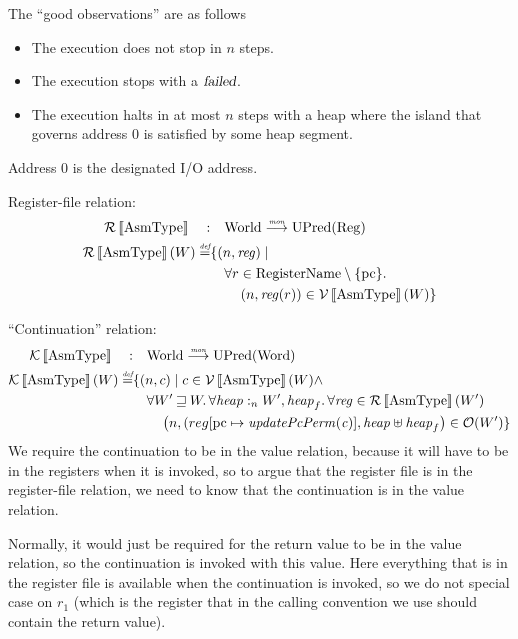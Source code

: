 \documentclass{article}
\newcommand{\update}[2]{[#1 \mapsto #2]}
\newcommand{\sem}[1]{\left\llbracket #1 \right\rrbracket}
\newcommand{\monfun}{\stackrel{\textit{\tiny{mon}}}{\longrightarrow}}
\newcommand{\defeq}{\stackrel{\textit{\tiny{def}}}{=}}
\newcommand{\var}[1]{\mathit{#1}}
\newcommand{\pcreg}{\mathrm{pc}}
\newcommand{\reg}{\var{reg}}
\newcommand{\heap}{\var{heap}}
\newcommand{\failed}{\textsl{failed}}
\newcommand{\plainfun}[1]{\mathit{#1}}
\newcommand{\updatePcPerm}[1]{\plainfun{updatePcPerm}(#1)}
\newcommand{\future}{\mathbin{\sqsupseteq}}
\newcommand{\heapSat}[3][\heap]{#1 :_{#2} #3}
\newcommand{\asmType}{\plaindom{AsmType}}
\newcommand{\plaindom}[1]{\mathrm{#1}}
\newcommand{\Words}{\plaindom{Word}}
\newcommand{\RegName}{\plaindom{RegisterName}}
\newcommand{\Regs}{\plaindom{Reg}}
\newcommand{\Worlds}{\plaindom{World}}
\newcommand{\UPred}[1]{\plaindom{UPred}(#1)}
\newcommand{\intr}[2]{\mathcal{#1}\sem{#2}}
\newcommand{\valueintr}[1]{\intr{V}{#1}}
\newcommand{\contintr}[1]{\intr{K}{#1}}
\newcommand{\regintr}[1]{\intr{R}{#1}}
\newcommand{\stdvr}{\valueintr{\asmType}}
\newcommand{\stdrr}{\regintr{\asmType}}
\newcommand{\stdkr}{\contintr{\asmType}}
\newcommand{\observations}{\mathcal{O}}
\newcommand{\npair}[2][n]{\left(#1,#2 \right)}
\begin{document}
The ``good observations'' are as follows
\begin{itemize}
\item The execution does not stop in $n$ steps. 
\item The execution stops with a $\failed$.
\item The execution halts in at most $n$ steps with a heap where the island that governs address 0 is satisfied by some heap segment.
\end{itemize}
Address 0 is the designated I/O address.

Register-file relation:
\begin{align*}
  \stdrr \quad : & \quad \Worlds \monfun \UPred{\Regs} \\
  \stdrr(W) \defeq & \{ \npair{\reg} \mid \\
                    & \quad \forall r \in \RegName \setminus \{\pcreg\} \ldotp \\
                    & \qquad  \npair{\reg(r)} \in \stdvr(W) \}
\end{align*}

``Continuation'' relation:
\begin{align*}
  \stdkr \quad : & \quad  \Worlds \monfun \UPred{\Words} \\%
  \stdkr(W) \defeq & \{ \npair{c} \mid c \in \stdvr(W) \land \\
                   & \quad  \forall W' \future W\ldotp %
                     \forall \heapSat{n}{W'}, \heap_f \ldotp \forall \reg \in \stdrr(W') \\
                   & \qquad \npair{(reg\update{\pcreg}{\updatePcPerm{\var{c}}}, \heap \uplus \heap_f} \in \observations(W') \}
\end{align*}
We require the continuation to be in the value relation, because it will have to be in the registers when it is invoked, so to argue that the register file is in the register-file relation, we need to know that the continuation is in the value relation.

Normally, it would just be required for the return value to be in the value relation, so the continuation is invoked with this value. Here everything that is in the register file is available when the continuation is invoked, so we do not special case on $r_1$ (which is the register that in the calling convention we use should contain the return value). 
\end{document}

